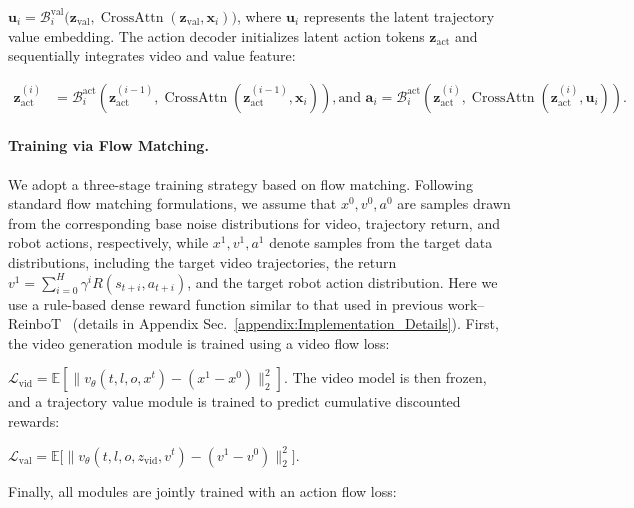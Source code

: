 $\mathbf{u}_i = \mathcal{B}_i^{\mathrm{val}}\big(\mathbf{z}_{\mathrm{val}}, \operatorname{CrossAttn}(\mathbf{z}_{\mathrm{val}}, \mathbf{x}_i)\big)$,
where $\mathbf{u}_i$ represents the latent trajectory value embedding.
The action decoder initializes latent action tokens $\mathbf{z}_{\mathrm{act}}$ and sequentially integrates video and value feature:

{

\begin{equation}
\begin{aligned}
\mathbf{z}_{\mathrm{act}}^{(i)}
&=
\mathcal{B}_i^{\mathrm{act}}\!\left(
\mathbf{z}_{\mathrm{act}}^{(i-1)},
\operatorname{CrossAttn}(\mathbf{z}_{\mathrm{act}}^{(i-1)}, \mathbf{x}_i)
\right), \text{and } 
\mathbf{a}_i
=
\mathcal{B}_i^{\mathrm{act}}\!\left(
\mathbf{z}_{\mathrm{act}}^{(i)},
\operatorname{CrossAttn}(\mathbf{z}_{\mathrm{act}}^{(i)}, \mathbf{u}_i)
\right).
\end{aligned}
\label{eq:action}
\end{equation}
}
\paragraph{Training via Flow Matching.}

We adopt a three-stage training strategy based on flow matching.
Following standard flow matching formulations,
we assume that $x^0, v^0, a^0$ are samples drawn from the corresponding base noise distributions
for video, trajectory return, and robot actions, respectively,
while $x^1, v^1, a^1$ denote samples from the target data distributions,
including the target video trajectories,
the return
$v^1 = \sum_{i=0}^{H} \gamma^i R(s_{t+i}, a_{t+i})$,
and the target robot action distribution.
Here we use a rule-based dense reward function similar to that used in previous work--ReinboT~\citep{zhang2025reinbot} (details in Appendix Sec.~\ref{appendix:Implementation_Details}).
First, the video generation module is trained using a video flow loss:

$\mathcal{L}_{\mathrm{vid}} = \mathbb{E}\!\left[\| v_\theta(t, l, o, x^t) - (x^1 - x^0) \|_2^2 \right]$.
The video model is then frozen, and a trajectory value module is trained to predict cumulative discounted rewards:

$\mathcal{L}_{\mathrm{val}} = \mathbb{E}\big[\| v_\theta(t, l, o, z_{\mathrm{vid}}, v^t) - (v^1 - v^0) \|_2^2 \big]$.

Finally, all modules are jointly trained with an action flow loss:

